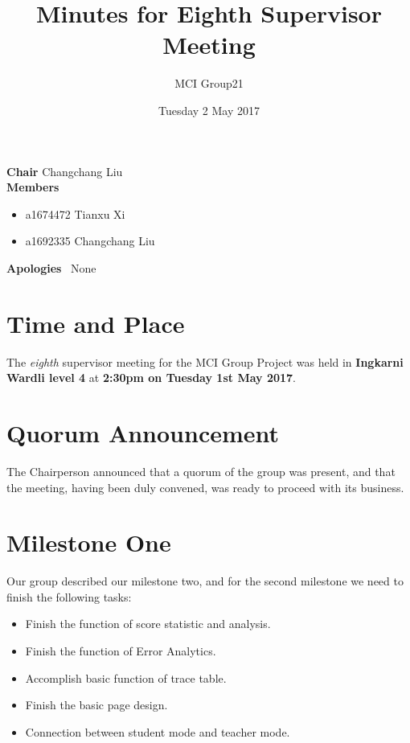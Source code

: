 \documentclass[11pt, a4paper]{article}
\begin{document}
\title{Minutes for Eighth Supervisor Meeting}
\author{MCI Group21}
\date{Tuesday 2 May 2017}
\maketitle

\vspace*{15pt}

\begin{center}
\begin{flushleft}
  \textbf{Chair}      \qquad Changchang Liu\\
  \textbf{Members}
  \begin {itemize}
  		\item a1674472 Tianxu Xi
		\item a1692335 Changchang Liu

  \end{itemize} 
  \textbf{Apologies}  \ None\\
\end{flushleft}
\end{center}




\vspace*{10pt}

\section{Time and Place}
The \emph{eighth} supervisor meeting for the MCI Group Project was held in \textbf{Ingkarni Wardli level 4} at \textbf{2:30pm on Tuesday 1st May 2017}.
 
\section{Quorum Announcement}
The Chairperson announced that a quorum of the group was present, and that the meeting, having been duly convened, was ready to proceed with its business.





\section{Milestone One}
Our group described our milestone two, and for the second milestone we need to finish the following tasks:
\begin{itemize}
\item Finish the function of score statistic and analysis.
\item Finish the function of Error Analytics.
\item Accomplish basic function of trace table.
\item Finish the basic page design.
\item Connection between student mode and teacher mode.
\end{itemize}
\end{document}
